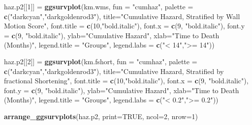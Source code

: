 \documentclass[
]{article}
\newenvironment{Shaded}{\begin{snugshade}}{\end{snugshade}}
\newcommand{\DataTypeTok}[1]{\textcolor[rgb]{0.13,0.29,0.53}{#1}}
\newcommand{\DecValTok}[1]{\textcolor[rgb]{0.00,0.00,0.81}{#1}}
\newcommand{\KeywordTok}[1]{\textcolor[rgb]{0.13,0.29,0.53}{\textbf{#1}}}
\newcommand{\NormalTok}[1]{#1}
\newcommand{\OtherTok}[1]{\textcolor[rgb]{0.56,0.35,0.01}{#1}}
\newcommand{\StringTok}[1]{\textcolor[rgb]{0.31,0.60,0.02}{#1}}
\begin{document}
\begin{Shaded}
\begin{Highlighting}[]
{{{{\NormalTok{haz.p2[[}\DecValTok{1}\NormalTok{]] =}\StringTok{ }\KeywordTok{ggsurvplot}\NormalTok{(km.wms, }
           \DataTypeTok{fun =} \StringTok{"cumhaz"}\NormalTok{,}
           \DataTypeTok{palette =} \KeywordTok{c}\NormalTok{(}\StringTok{"darkcyan"}\NormalTok{,}\StringTok{"darkgoldenrod3"}\NormalTok{), }
           \DataTypeTok{title=}\StringTok{"Cumulative Hazard, Stratified by Wall Motion Score"}\NormalTok{,}
           \DataTypeTok{font.title =} \KeywordTok{c}\NormalTok{(}\DecValTok{10}\NormalTok{,}\StringTok{"bold.italic"}\NormalTok{),}
           \DataTypeTok{font.x =} \KeywordTok{c}\NormalTok{(}\DecValTok{9}\NormalTok{, }\StringTok{"bold.italic"}\NormalTok{),}
           \DataTypeTok{font.y =} \KeywordTok{c}\NormalTok{(}\DecValTok{9}\NormalTok{, }\StringTok{"bold.italic"}\NormalTok{),}
           \DataTypeTok{ylab=}\StringTok{"Cumulative Hazard"}\NormalTok{, }
           \DataTypeTok{xlab=}\StringTok{"Time to Death (Months)"}\NormalTok{,}
           \DataTypeTok{legend.title =} \StringTok{"Groups"}\NormalTok{,}
           \DataTypeTok{legend.labs =} \KeywordTok{c}\NormalTok{(}\StringTok{"< 14"}\NormalTok{,}\StringTok{">= 14"}\NormalTok{))}

\NormalTok{haz.p2[[}\DecValTok{2}\NormalTok{]] =}\StringTok{ }\KeywordTok{ggsurvplot}\NormalTok{(km.fshort,}
           \DataTypeTok{fun =} \StringTok{"cumhaz"}\NormalTok{,}
           \DataTypeTok{palette =} \KeywordTok{c}\NormalTok{(}\StringTok{"darkcyan"}\NormalTok{,}\StringTok{"darkgoldenrod3"}\NormalTok{), }
           \DataTypeTok{title=}\StringTok{"Cumulative Hazard, Stratified by fractional Shortening"}\NormalTok{,}
           \DataTypeTok{font.title =} \KeywordTok{c}\NormalTok{(}\DecValTok{10}\NormalTok{,}\StringTok{"bold.italic"}\NormalTok{),}
           \DataTypeTok{font.x =} \KeywordTok{c}\NormalTok{(}\DecValTok{9}\NormalTok{, }\StringTok{"bold.italic"}\NormalTok{),}
           \DataTypeTok{font.y =} \KeywordTok{c}\NormalTok{(}\DecValTok{9}\NormalTok{, }\StringTok{"bold.italic"}\NormalTok{),}
           \DataTypeTok{ylab=}\StringTok{"Cumulative Hazard"}\NormalTok{, }
           \DataTypeTok{xlab=}\StringTok{"Time to Death (Months)"}\NormalTok{,}
           \DataTypeTok{legend.title =} \StringTok{"Groups"}\NormalTok{,}
           \DataTypeTok{legend.labs =} \KeywordTok{c}\NormalTok{(}\StringTok{"< 0.2"}\NormalTok{,}\StringTok{">= 0.2"}\NormalTok{))}

\KeywordTok{arrange_ggsurvplots}\NormalTok{(haz.p2, }\DataTypeTok{print=}\OtherTok{TRUE}\NormalTok{, }\DataTypeTok{ncol=}\DecValTok{2}\NormalTok{, }\DataTypeTok{nrow=}\DecValTok{1}\NormalTok{)}


}}}}
\end{Highlighting}
\end{Shaded}
\end{document}
